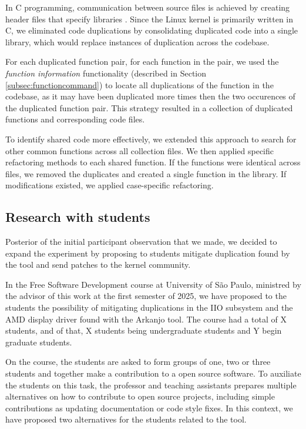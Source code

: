 In C programming, communication between source files is achieved by creating header files that specify 
libraries \citep{Cbook}. Since the Linux kernel is primarily written in C, we eliminated code duplications 
by consolidating duplicated code into a single library, which would replace instances of 
duplication across the codebase.

For each duplicated function pair, for each function in the pair, we used the \textit{function information} functionality 
(described in Section \ref{subsec:functioncommand}) to locate all duplications of the function in the codebase, 
as it may have been duplicated more times then the two occurences of the duplicated function pair. 
This strategy resulted in a collection of duplicated functions and corresponding code files.

To identify shared code more effectively, we extended this approach to search for other common 
functions across all collection files. We then applied specific refactoring methods to each shared 
function. If the functions were identical across files, we removed the duplicates and created a single 
function in the library. If modifications existed, we applied case-specific refactoring.

\subsection{Research with students}


Posterior of the initial participant observation that we made, we decided to expand the experiment 
by proposing to students mitigate duplication found by the tool and send patches to the kernel community.

In the Free Software Development course at University of São Paulo, ministred by the advisor 
of this work at the first semester of 2025, we have proposed to the students the possibility
of mitigating duplications in the IIO subsystem and the AMD display driver found with the Arkanjo tool.
The course had a total of X students, and of that, X students being undergraduate students
and Y begin graduate students.

On the course, the students are asked to form groups of one, two or three students and together 
make a contribution to a open source software. To auxiliate the students on this task, the 
professor and teaching assistants prepares multiple alternatives on how to contribute to open source projects, 
including simple contributions as updating documentation or code style fixes. In this context, 
we have proposed two alternatives for the students related to the tool.

